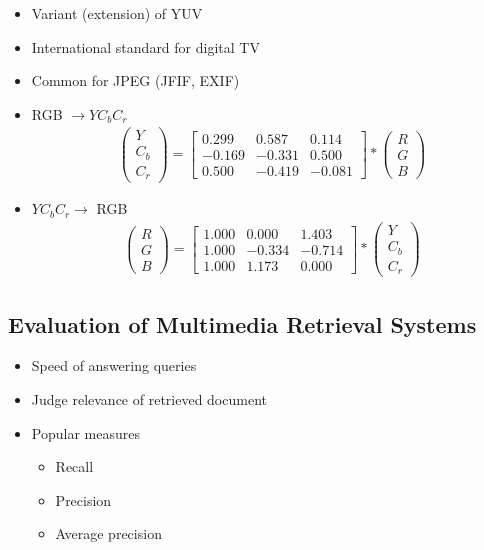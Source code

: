 \documentclass{scrartcl}
\begin{document}
\begin{itemize}
	\item Variant (extension) of YUV
	\item International standard for digital TV
	\item Common for JPEG (JFIF, EXIF)
	\item RGB $ \rightarrow YC_bC_r $
	\begin{align*}
		\begin{pmatrix}
			Y \\
			C_b \\
			C_r
		\end{pmatrix} = \begin{bmatrix}
			0.299 & 0.587 & 0.114 \\
			-0.169 & -0.331 & 0.500 \\
			0.500 & -0.419 & -0.081
		\end{bmatrix} * \begin{pmatrix}
			R \\
			G \\
			B
		\end{pmatrix}
	\end{align*}
	\item $ YC_bC_r \rightarrow $ RGB
	\begin{align*}
		\begin{pmatrix}
			R \\
			G \\
			B
		\end{pmatrix} = \begin{bmatrix}
			1.000 & 0.000 & 1.403 \\
			1.000 & -0.334 & -0.714 \\
			1.000 & 1.173 & 0.000
		\end{bmatrix} * \begin{pmatrix}
			Y \\
			C_b \\
			C_r
		\end{pmatrix}
	\end{align*}
\end{itemize}

\subsection{Evaluation of Multimedia Retrieval Systems}

\begin{itemize}
	\item Speed of answering queries
	\item Judge relevance of retrieved document
	\item Popular measures
	\begin{itemize}
		\item Recall
		\item Precision
		\item Average precision
	\end{itemize}
\end{itemize}
\end{document}
